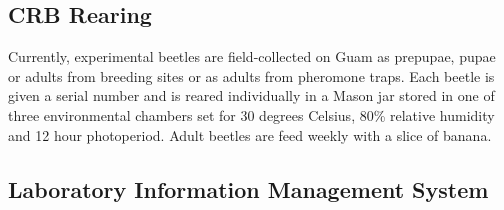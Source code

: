 \documentclass[12pt,letterpaper,english,bibliography=totocnumbered]{scrartcl}
\begin{document}
\begin{comment}

\clearpage
\begin{table}
	\begin{threeparttable}
		\caption{Sample ANOVA table}
		\begin{tabular}{lllll}
			\toprule
			Stubhead & \( df \) & \( f \) & \( \eta \) & \( p \) \\
			\midrule
			&     \multicolumn{4}{c}{Spanning text}     \\
			Row 1    & 1        & 0.67    & 0.55       & 0.41    \\
			Row 2    & 2        & 0.02    & 0.01       & 0.39    \\
			Row 3    & 3        & 0.15    & 0.33       & 0.34    \\
			Row 4    & 4        & 1.00    & 0.76       & 0.54    \\
			\bottomrule
		\end{tabular}
		\begin{tablenotes}
			\small
			\item This is where authors provide additional information about
			the data, including whatever notes are needed.
		\end{tablenotes}
	\end{threeparttable}
\end{table}

\end{comment}








\clearpage
\subsection{CRB Rearing}

Currently, experimental beetles are field-collected on Guam as prepupae, pupae or adults from breeding sites or as adults from pheromone traps.  Each beetle is given a serial number and is reared individually in a Mason jar stored in one of three environmental chambers set for 30 degrees Celsius, 80\% relative humidity and 12 hour photoperiod. Adult beetles are feed weekly with a slice of banana. 

\subsection{Laboratory Information Management System}\label{lims}
\end{document}

